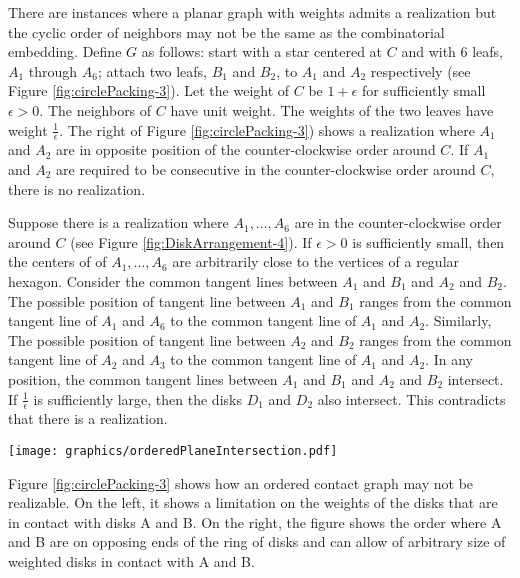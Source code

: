 \documentclass[10pt]{CSUNthesis}
\theoremstyle{plain}%
\theoremstyle{definition}
\theoremstyle{remark}
\begin{document}
There are instances where a planar graph with weights admits a realization but the cyclic order of neighbors may not be the same as the combinatorial embedding.
Define $G$ as follows: start with a star centered at $C$ and with 6 leafs, $A_1$ through $A_6$; attach two leafs, $B_1$ and $B_2$, to $A_1$ and  $A_2$ respectively (see  Figure \ref{fig:circlePacking-3}).
Let the weight of $C$ be $1+\epsilon$ for sufficiently small $\epsilon > 0$.
The neighbors of $C$ have unit weight.
The weights of the two leaves have weight $\frac{1}{\epsilon}$.  
The right of Figure \ref{fig:circlePacking-3}) shows a realization where $A_1$ and $A_2$ are in opposite position of the counter-clockwise order around $C$.
If $A_1$ and $A_2$ are required to be consecutive in the counter-clockwise order around $C$, there is no realization.

Suppose there is a realization where $A_1, \ldots, A_6$ are in the counter-clockwise order around $C$ (see Figure \ref{fig:DiskArrangement-4}).
If $\epsilon>0$ is sufficiently small, then the centers of of $A_1, \ldots, A_6$ are arbitrarily close to the vertices of a regular hexagon.
Consider the common tangent lines between $A_1$ and $B_1$ and $A_2$ and $B_2$.
The possible position of tangent line between $A_1$ and $B_1$ ranges from the common tangent line of $A_1$ and $A_6$ to the common tangent line of $A_1$ and $A_2$.
Similarly, The possible position of tangent line between $A_2$ and $B_2$ ranges from the common tangent line of $A_2$ and $A_3$ to the common tangent line of $A_1$ and $A_2$.
In any position, the common tangent lines between $A_1$ and $B_1$ and $A_2$ and $B_2$ intersect.
If $\frac{1}{\epsilon}$ is sufficiently large, then the disks $D_1$ and $D_2$ also intersect.
This contradicts that there is a realization.

\begin{minipage}{\linewidth}
\begin{center}
\texttt{[image: graphics/orderedPlaneIntersection.pdf]}
\end{center}
\label{fig:DiskArrangement-4}
\end{minipage}

Figure \ref{fig:circlePacking-3} shows how an ordered contact graph may not be realizable.  
On the left, it shows a limitation on the weights of the disks that are in contact with disks A and B. 
On the right, the figure shows the order where A and B are on opposing ends of the ring of disks and can allow of arbitrary size of weighted disks in contact with A and B.
\end{document}
